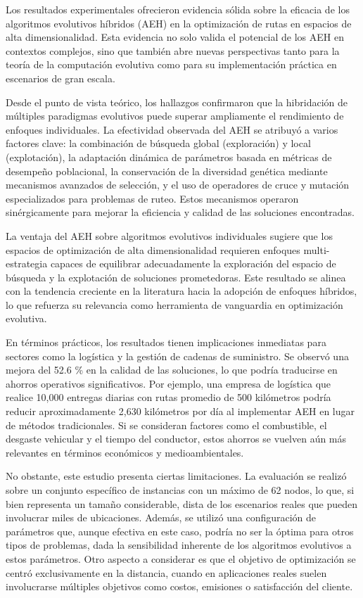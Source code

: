 \documentclass[10pt,a4paper]{article}
\begin{document}
Los resultados experimentales ofrecieron evidencia sólida sobre la eficacia de los algoritmos evolutivos híbridos (AEH) en la optimización de rutas en espacios de alta dimensionalidad. Esta evidencia no solo valida el potencial de los AEH en contextos complejos, sino que también abre nuevas perspectivas tanto para la teoría de la computación evolutiva como para su implementación práctica en escenarios de gran escala.

Desde el punto de vista teórico, los hallazgos confirmaron que la hibridación de múltiples paradigmas evolutivos puede superar ampliamente el rendimiento de enfoques individuales. La efectividad observada del AEH se atribuyó a varios factores clave: la combinación de búsqueda global (exploración) y local (explotación), la adaptación dinámica de parámetros basada en métricas de desempeño poblacional, la conservación de la diversidad genética mediante mecanismos avanzados de selección, y el uso de operadores de cruce y mutación especializados para problemas de ruteo. Estos mecanismos operaron sinérgicamente para mejorar la eficiencia y calidad de las soluciones encontradas.

La ventaja del AEH sobre algoritmos evolutivos individuales sugiere que los espacios de optimización de alta dimensionalidad requieren enfoques multi-estrategia capaces de equilibrar adecuadamente la exploración del espacio de búsqueda y la explotación de soluciones prometedoras. Este resultado se alinea con la tendencia creciente en la literatura hacia la adopción de enfoques híbridos, lo que refuerza su relevancia como herramienta de vanguardia en optimización evolutiva.

En términos prácticos, los resultados tienen implicaciones inmediatas para sectores como la logística y la gestión de cadenas de suministro. Se observó una mejora del 52.6 \% en la calidad de las soluciones, lo que podría traducirse en ahorros operativos significativos. Por ejemplo, una empresa de logística que realice 10,000 entregas diarias con rutas promedio de 500 kilómetros podría reducir aproximadamente 2,630 kilómetros por día al implementar AEH en lugar de métodos tradicionales. Si se consideran factores como el combustible, el desgaste vehicular y el tiempo del conductor, estos ahorros se vuelven aún más relevantes en términos económicos y medioambientales.

No obstante, este estudio presenta ciertas limitaciones. La evaluación se realizó sobre un conjunto específico de instancias con un máximo de 62 nodos, lo que, si bien representa un tamaño considerable, dista de los escenarios reales que pueden involucrar miles de ubicaciones. Además, se utilizó una configuración de parámetros que, aunque efectiva en este caso, podría no ser la óptima para otros tipos de problemas, dada la sensibilidad inherente de los algoritmos evolutivos a estos parámetros. Otro aspecto a considerar es que el objetivo de optimización se centró exclusivamente en la distancia, cuando en aplicaciones reales suelen involucrarse múltiples objetivos como costos, emisiones o satisfacción del cliente.
\end{document}
